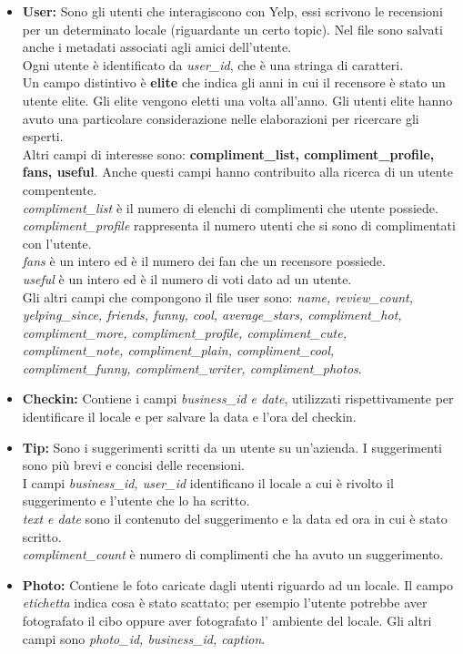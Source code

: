 \begin{itemize}
\item \textbf{User:}
Sono gli utenti che interagiscono con Yelp, essi scrivono le recensioni per un determinato locale (riguardante un certo topic).
Nel file sono salvati anche i metadati associati agli amici dell'utente.\\
Ogni utente è identificato da \textit{user\_id}, che è una stringa di caratteri.\\
Un campo distintivo è \textbf{elite} che indica gli anni in cui il recensore è stato un utente elite.
Gli elite vengono eletti una volta all'anno.
Gli utenti elite hanno avuto una particolare considerazione nelle elaborazioni per ricercare gli esperti.\\ 
Altri campi di interesse sono: \textbf{compliment\_list, compliment\_profile, fans, useful}.
Anche questi campi hanno contribuito alla ricerca di un utente compentente.\\
\textit{compliment\_list} è il numero di elenchi di complimenti che utente possiede.\\
\textit{compliment\_profile} rappresenta il numero utenti che si sono di complimentati con l'utente.\\
\textit{fans} è un intero ed è il numero dei fan che un recensore possiede.\\
\textit{useful} è un intero ed è il numero di voti dato ad un utente.\\
Gli altri campi che compongono il file user sono:
\textit{name, review\_count, yelping\_since, friends, funny, cool, average\_stars, compliment\_hot, compliment\_more, compliment\_profile, compliment\_cute, \\ compliment\_note, compliment\_plain, compliment\_cool,\\ compliment\_funny, compliment\_writer, compliment\_photos}.

\item \textbf{Checkin:}
Contiene i campi \textit{business\_id e date}, utilizzati rispettivamente per identificare
il locale e per salvare la data e l'ora del checkin.

\item \textbf{Tip:}
Sono i suggerimenti scritti da un utente su un'azienda. I suggerimenti sono più brevi e concisi delle recensioni.\\
I campi \textit{ business\_id, user\_id} identificano il locale a cui è rivolto il suggerimento e l'utente che lo ha scritto.\\
\textit{text e date} sono il contenuto del suggerimento e la data ed ora in cui è stato scritto.\\
\textit{compliment\_count} è numero di complimenti che ha avuto un suggerimento.
\item \textbf{Photo:}
Contiene le foto caricate dagli utenti riguardo ad un locale.
Il campo \textit{etichetta} indica cosa è stato scattato; per esempio l'utente potrebbe aver fotografato il cibo oppure aver fotografato l' ambiente del locale.
Gli altri campi sono \textit{photo\_id, business\_id, caption}.
\end{itemize}
